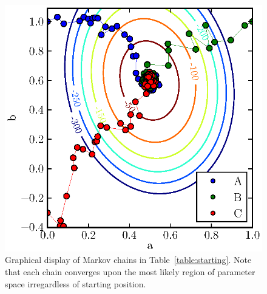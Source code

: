 \documentclass[iop,floatfix]{emulateapj}
\begin{document}
\begin{figure}
\begin{center}
  \includegraphics{2d_all}
  \caption{Graphical display of Markov chains in Table~\ref{table:starting}. Note that each chain converges upon the most likely region of parameter space irregardless of starting position.}
\label{fig:2d_all}
\end{center}
\end{figure}



\end{document}
